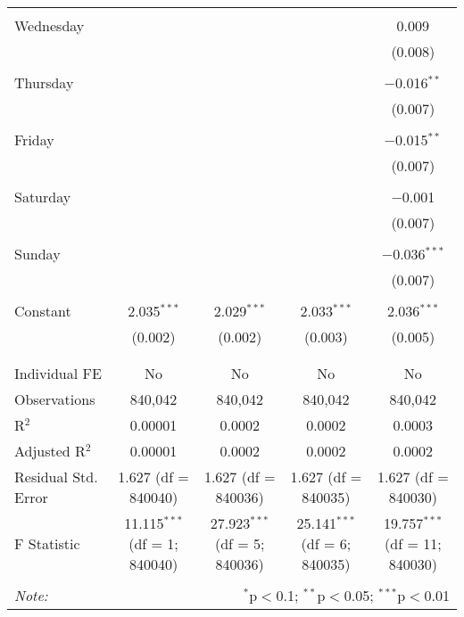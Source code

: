 \documentclass[
]{article}
\begin{document}
\begin{table}[!htbp]
{\begin{tabular}{@{\extracolsep{5pt}}lcccc}
  & & & & \\ 
 Wednesday &  &  &  & 0.009 \\ 
  &  &  &  & (0.008) \\ 
  & & & & \\ 
 Thursday &  &  &  & $-$0.016$^{**}$ \\ 
  &  &  &  & (0.007) \\ 
  & & & & \\ 
 Friday &  &  &  & $-$0.015$^{**}$ \\ 
  &  &  &  & (0.007) \\ 
  & & & & \\ 
 Saturday &  &  &  & $-$0.001 \\ 
  &  &  &  & (0.007) \\ 
  & & & & \\ 
 Sunday &  &  &  & $-$0.036$^{***}$ \\ 
  &  &  &  & (0.007) \\ 
  & & & & \\ 
 Constant & 2.035$^{***}$ & 2.029$^{***}$ & 2.033$^{***}$ & 2.036$^{***}$ \\ 
  & (0.002) & (0.002) & (0.003) & (0.005) \\ 
  & & & & \\ 
\hline \\[-1.8ex] 
Individual FE & No & No & No & No \\ 
Observations & 840,042 & 840,042 & 840,042 & 840,042 \\ 
R$^{2}$ & 0.00001 & 0.0002 & 0.0002 & 0.0003 \\ 
Adjusted R$^{2}$ & 0.00001 & 0.0002 & 0.0002 & 0.0002 \\ 
Residual Std. Error & 1.627 (df = 840040) & 1.627 (df = 840036) & 1.627 (df = 840035) & 1.627 (df = 840030) \\ 
F Statistic & 11.115$^{***}$ (df = 1; 840040) & 27.923$^{***}$ (df = 5; 840036) & 25.141$^{***}$ (df = 6; 840035) & 19.757$^{***}$ (df = 11; 840030) \\ 
\hline 
\hline \\[-1.8ex] 
\textit{Note:}  & \multicolumn{4}{r}{$^{*}$p$<$0.1; $^{**}$p$<$0.05; $^{***}$p$<$0.01} \\ 
\end{tabular}
} 
\end{table} 
\newpage
\end{document}
